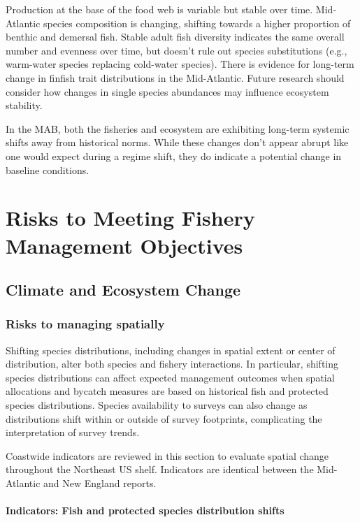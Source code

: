\documentclass[
  10pt,
]{article}
\begin{document}
Production at the base of the food web is variable but stable over time. Mid-Atlantic species composition is changing, shifting towards a higher proportion of benthic and demersal fish. Stable adult fish diversity indicates the same overall number and evenness over time, but doesn't rule out species substitutions (e.g., warm-water species replacing cold-water species). There is evidence for long-term change in finfish trait distributions in the Mid-Atlantic. Future research should consider how changes in single species abundances may influence ecosystem stability.

In the MAB, both the fisheries and ecosystem are exhibiting long-term systemic shifts away from historical norms. While these changes don't appear abrupt like one would expect during a regime shift, they do indicate a potential change in baseline conditions.

\section{Risks to Meeting Fishery Management Objectives}\label{risks-to-meeting-fishery-management-objectives}

\subsection{Climate and Ecosystem Change}\label{climate-and-ecosystem-change}

\subsubsection{Risks to managing spatially}\label{risks-to-managing-spatially}

Shifting species distributions, including changes in spatial extent or center of distribution, alter both species and fishery interactions. In particular, shifting species distributions can affect expected management outcomes when spatial allocations and bycatch measures are based on historical fish and protected species distributions. Species availability to surveys can also change as distributions shift within or outside of survey footprints, complicating the interpretation of survey trends.

Coastwide indicators are reviewed in this section to evaluate spatial change throughout the Northeast US shelf. Indicators are identical between the Mid-Atlantic and New England reports.

\paragraph{Indicators: Fish and protected species distribution shifts}\label{indicators-fish-and-protected-species-distribution-shifts}
\end{document}
